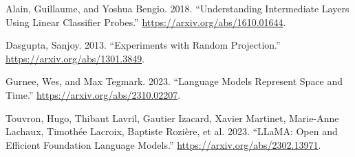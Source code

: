 \documentclass[
  letterpaper,
  DIV=11,
  numbers=noendperiod]{scrartcl}
\newlength{\cslhangindent}
\newlength{\cslentryspacingunit} %
\newenvironment{CSLReferences}[2] %
 {%
  \setlength{\parindent}{0pt}
  \ifodd #1
  \let\oldpar\par
  \def\par{\hangindent=\cslhangindent\oldpar}
  \fi
  \setlength{\parskip}{#2\cslentryspacingunit}
 }%
 {}
\begin{document}
\hypertarget{refs}{}
\begin{CSLReferences}{1}{0}
\leavevmode{}%
Alain, Guillaume, and Yoshua Bengio. 2018. {``Understanding Intermediate
Layers Using Linear Classifier Probes.''}
\url{https://arxiv.org/abs/1610.01644}.

\leavevmode{}%
Dasgupta, Sanjoy. 2013. {``Experiments with Random Projection.''}
\url{https://arxiv.org/abs/1301.3849}.

\leavevmode{}%
Gurnee, Wes, and Max Tegmark. 2023. {``Language Models Represent Space
and Time.''} \url{https://arxiv.org/abs/2310.02207}.

\leavevmode{}%
Touvron, Hugo, Thibaut Lavril, Gautier Izacard, Xavier Martinet,
Marie-Anne Lachaux, Timothée Lacroix, Baptiste Rozière, et al. 2023.
{``LLaMA: Open and Efficient Foundation Language Models.''}
\url{https://arxiv.org/abs/2302.13971}.

\end{CSLReferences}
\end{document}
